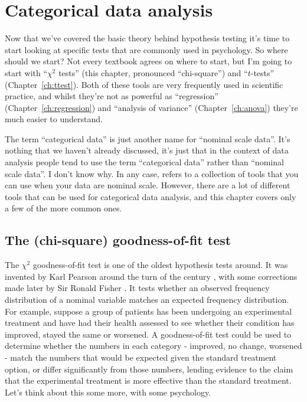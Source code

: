 
\chapter{Categorical data analysis\label{ch:chisquare}}

Now that we've covered the basic theory behind hypothesis testing it's time to start looking at specific tests that are commonly used in psychology. So where should we start? Not every textbook agrees on where to start, but I'm going to start with ``$\chi^2$ tests'' (this chapter, pronounced ``chi-square'') and ``$t$-tests'' (Chapter~\ref{ch:ttest}). Both of these tools are very frequently used in scientific practice, and whilst they're not as powerful as ``regression'' (Chapter~\ref{ch:regression}) and ``analysis of variance'' (Chapter~\ref{ch:anova}) they're much easier to understand.

The term ``categorical data'' is just another name for ``nominal scale data''. It's nothing that we haven't already discussed, it's just that in the context of data analysis people tend to use the term ``categorical data'' rather than ``nominal scale data''. I don't know why. In any case,  refers to a collection of tools that you can use when your data are nominal scale. However, there are a lot of different tools that can be used for categorical data analysis, and this chapter covers only a few of the more common ones.


\section{The \texorpdfstring{}{} (chi-square) goodness-of-fit test~\label{sec:goftest}}

The $\chi^2$ goodness-of-fit test is one of the oldest hypothesis tests around. It was invented by Karl Pearson around the turn of the century \parencite{Pearson1900}, with some corrections made later by  Sir Ronald Fisher \parencite{Fisher1922}. It tests whether an observed frequency distribution of a nominal variable matches an expected frequency distribution. For example, suppose a group of patients has been undergoing an experimental treatment and have had their health assessed to see whether their condition has improved, stayed the same or worsened. A goodness-of-fit test could be used to determine whether the numbers in each category - improved, no change, worsened - match the numbers that would be expected given the standard treatment option, or differ significantly from those numbers, lending evidence to the claim that the experimental treatment is more effective than the standard treatment. Let's think about this some more, with some psychology. 

